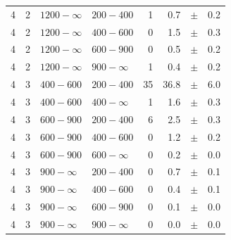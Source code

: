 \begin{table}[!h]
\begin{tabular}{rrllrrcl}
4\T & 2 & $1200- \infty$ & $200-400$ &      1 &      0.7 &$\pm$&    0.2 \\
4 & 2 & $1200- \infty$ & $400-600$ &      0 &      1.5 &$\pm$&    0.3 \\
4 & 2 & $1200- \infty$ & $600-900$ &      0 &      0.5 &$\pm$&    0.2 \\
4 & 2 & $1200- \infty$ & $900-\infty$ &      1 &      0.4 &$\pm$&    0.2 \\
4\T & 3 & $ 400- 600$ & $200-400$ &     35 &     36.8 &$\pm$&    6.0 \\
4 & 3 & $ 400- 600$ & $400-\infty$ &      1 &      1.6 &$\pm$&    0.3 \\
4\T & 3 & $ 600- 900$ & $200-400$ &      6 &      2.5 &$\pm$&    0.3 \\
4 & 3 & $ 600- 900$ & $400-600$ &      0 &      1.2 &$\pm$&    0.2 \\
4 & 3 & $ 600- 900$ & $600-\infty$ &      0 &      0.2 &$\pm$&    0.0 \\
4\T & 3 & $ 900- \infty$ & $200-400$ &      0 &      0.7 &$\pm$&    0.1 \\
4 & 3 & $ 900- \infty$ & $400-600$ &      0 &      0.4 &$\pm$&    0.1 \\
4 & 3 & $ 900- \infty$ & $600-900$ &      0 &      0.1 &$\pm$&    0.0 \\
4 & 3 & $ 900- \infty$ & $900-\infty$ &      0 &      0.0 &$\pm$&    0.0 \\
    \hline
  \end{tabular}
\end{table}

